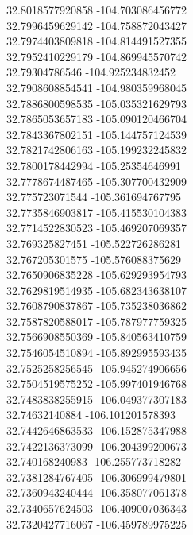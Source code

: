 {32.8018577920858	-104.703086456772\\
32.7996459629142	-104.758872043427\\
32.7974403809818	-104.814491527355\\
32.7952410229179	-104.869945570742\\
32.79304786546	-104.925234832452\\
32.7908608854541	-104.980359968045\\
32.7886800598535	-105.035321629793\\
32.7865053657183	-105.090120466704\\
32.7843367802151	-105.144757124539\\
32.7821742806163	-105.199232245832\\
32.7800178442994	-105.25354646991\\
32.7778674487465	-105.307700432909\\
32.775723071544	-105.361694767795\\
32.7735846903817	-105.415530104383\\
32.7714522830523	-105.469207069357\\
32.769325827451	-105.522726286281\\
32.767205301575	-105.576088375629\\
32.7650906835228	-105.629293954793\\
32.7629819514935	-105.682343638107\\
32.7608790837867	-105.735238036862\\
32.7587820588017	-105.787977759325\\
32.7566908550369	-105.840563410759\\
32.7546054510894	-105.892995593435\\
32.7525258256545	-105.945274906656\\
32.7504519575252	-105.997401946768\\
32.7483838255915	-106.049377307183\\
32.74632140884	-106.101201578393\\
32.7442646863533	-106.152875347988\\
32.7422136373099	-106.204399200673\\
32.740168240983	-106.255773718282\\
32.7381284767405	-106.306999479801\\
32.7360943240444	-106.358077061378\\
32.7340657624503	-106.409007036343\\
32.7320427716067	-106.459789975225\\
}
